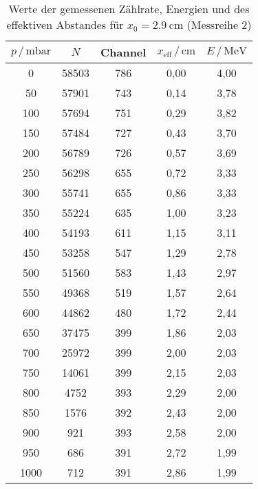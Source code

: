   \begin{table}
    \centering
    \caption{Werte der gemessenen Zählrate, Energien und des effektiven Abstandes für 
              $x_0 = \SI{2.9}{\centi\meter}$ (Messreihe 2)}
    \label{tab:mess2}
    \begin{tabular}{c c c c c}
    \toprule
    $p \,/\, \si{\milli\bar}$ & $N$ & Channel & $x_\text{eff} \,/\, \si{\centi\meter}$ & 
    $E \,/\, \si{\mega\eV}$\\
    \midrule 
         0 & 58503 & 786 & 0,00 & 4,00 \\
        50 & 57901 & 743 & 0,14 & 3,78 \\
       100 & 57694 & 751 & 0,29 & 3,82 \\
       150 & 57484 & 727 & 0,43 & 3,70 \\
       200 & 56789 & 726 & 0,57 & 3,69 \\
       250 & 56298 & 655 & 0,72 & 3,33 \\
       300 & 55741 & 655 & 0,86 & 3,33 \\
       350 & 55224 & 635 & 1,00 & 3,23 \\
       400 & 54193 & 611 & 1,15 & 3,11 \\
       450 & 53258 & 547 & 1,29 & 2,78 \\
       500 & 51560 & 583 & 1,43 & 2,97 \\
       550 & 49368 & 519 & 1,57 & 2,64 \\
       600 & 44862 & 480 & 1,72 & 2,44 \\
       650 & 37475 & 399 & 1,86 & 2,03 \\
       700 & 25972 & 399 & 2,00 & 2,03 \\
       750 & 14061 & 399 & 2,15 & 2,03 \\
       800 &  4752 & 393 & 2,29 & 2,00 \\
       850 &  1576 & 392 & 2,43 & 2,00 \\
       900 &   921 & 393 & 2,58 & 2,00 \\
       950 &   686 & 391 & 2,72 & 1,99 \\
      1000 &   712 & 391 & 2,86 & 1,99 \\
    \bottomrule
    \end{tabular}
    \end{table}

